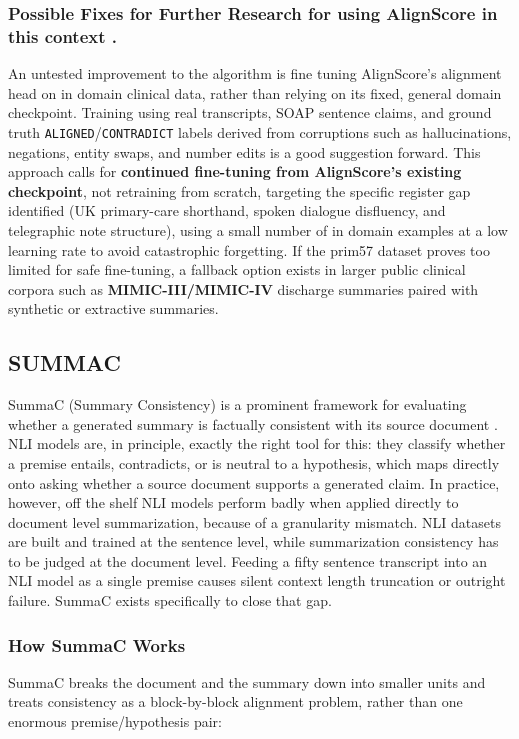 \documentclass[11pt,a4paper]{article}
\begin{document}
\subsubsection{Possible Fixes for Further Research for using AlignScore in this context . }

An untested improvement to the algorithm is fine tuning AlignScore's alignment head on in domain clinical data, rather than relying on its fixed, general domain checkpoint. Training using real transcripts, SOAP sentence claims, and ground truth \verb|ALIGNED|/\verb|CONTRADICT| labels derived from corruptions such as hallucinations, negations, entity swaps, and number edits is a good suggestion forward. This approach calls for \textbf{continued fine-tuning from AlignScore's existing checkpoint}, not retraining from scratch, targeting the specific register gap identified  (UK primary-care shorthand, spoken dialogue disfluency, and telegraphic note structure), using a small number of in domain examples at a low learning rate to avoid catastrophic forgetting. If the prim57 dataset proves too limited for safe fine-tuning, a fallback option exists in larger public clinical corpora such as \textbf{MIMIC-III/MIMIC-IV} discharge summaries paired with synthetic or extractive summaries.

 

\subsection{SUMMAC}
\label{sec:SUMMAC}

SummaC (Summary Consistency) is a prominent framework for evaluating whether a generated summary is factually consistent with its source document \cite{laban2022summac} . NLI models are, in principle, exactly the right tool for this: they classify whether a premise entails, contradicts, or is neutral to a hypothesis, which maps directly onto asking whether a source document supports a generated claim. In practice, however, off the shelf NLI models perform badly when applied directly to document level summarization, because of a granularity mismatch.  NLI datasets are built and trained at the sentence level, while summarization consistency has to be judged at the document level. Feeding a fifty sentence transcript into an NLI model as a single premise causes silent context length truncation or outright failure. SummaC exists specifically to close that gap.

\subsubsection{How SummaC Works}
SummaC breaks the document and the summary down into smaller units and treats consistency as a block-by-block alignment problem, rather than one enormous premise/hypothesis pair:
\end{document}
